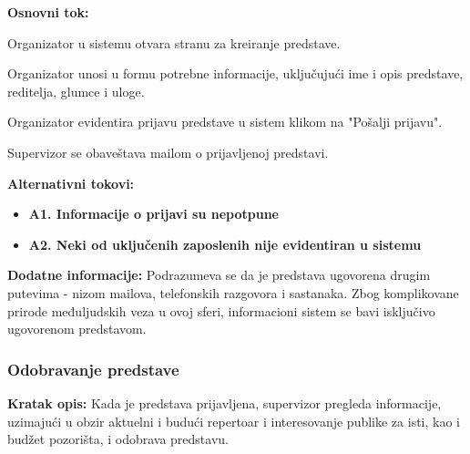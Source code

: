\documentclass[a4paper]{article}
\begin{document}
\noindent\textbf{Osnovni tok:}
  \begin{legal}
    \item Organizator u sistemu otvara stranu za kreiranje predstave.
    \item Organizator unosi u formu potrebne informacije, uključujući ime i opis predstave, reditelja, glumce i uloge. 
    \item Organizator evidentira prijavu predstave u sistem klikom na "Pošalji prijavu". 
    \item Supervizor se obaveštava mailom o prijavljenoj predstavi.
  \end{legal}

\noindent\textbf{Alternativni tokovi:} 
\begin{itemize}
  \item \textbf{A1. Informacije o prijavi su nepotpune} 
  \item \textbf{A2. Neki od uključenih zaposlenih nije evidentiran u sistemu} 
\end{itemize}

\noindent\textbf{Dodatne informacije:} Podrazumeva se da je predstava ugovorena drugim putevima - nizom mailova, telefonskih razgovora i sastanaka. Zbog komplikovane prirode međuljudskih veza u ovoj sferi, informacioni sistem se bavi isključivo ugovorenom predstavom. 

\subsubsection{Odobravanje predstave}
\noindent\textbf{Kratak opis:} Kada je predstava prijavljena, supervizor pregleda informacije, uzimajući u obzir aktuelni i budući repertoar i interesovanje publike za isti, kao i budžet pozorišta, i odobrava predstavu. 
\end{document}
